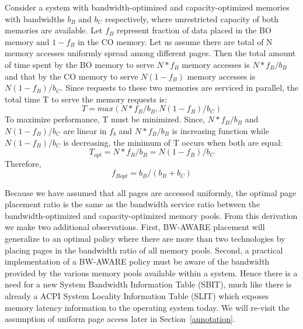 Consider a system with bandwidth-optimized and capacity-optimized
memories with bandwidths $b_B$ and $b_C$ respectively, where unrestricted
capacity of both memories are available. Let $f_B$ represent fraction of data
placed in the BO memory and $1-f_B$ in the CO memory.  Let us assume there are total of
N memory accesses uniformly spread among different pages. Then the total amount
of time spent by the BO memory to serve $N*f_B$ memory accesses is $N*f_B/b_B$ and
that by the CO memory to serve $N(1-f_B)$ memory accesses is $N(1-f_B)/b_C$.  Since
requests to these two memories are serviced in parallel, the total time T to serve the
memory requests is: 
$$T=max(N*f_B/b_B, N(1-f_B)/b_C)$$
To maximize performance, T must be minimized. Since, $N*f_B/b_B$ and
$N(1-f_B)/b_C$ are linear in $f_b$ and $N*f_B/b_B$ is increasing function while
$N(1-f_B)/b_C$ is decreasing, the minimum of T occurs when both are equal:
$$T_{opt}=N*f_B/b_B = N(1-f_B)/b_C$$
Therefore,
$$f_{Bopt}=b_B/(b_B+b_C)$$

Because we have assumed that all pages are accessed uniformly, the optimal page
placement ratio is the same as the bandwidth service ratio between the bandwidth-optimized
and capacity-optimized memory pools. From this derivation we make two additional
observations.  First, BW-AWARE placement will generalize to an optimal policy
where there are more than two technologies by placing pages in the bandwidth ratio
of all memory pools. Second, a practical implementation
of a BW-AWARE policy must be aware of the bandwidth provided by the various
memory pools available within a system. Hence there is a need for a new System
Bandwidth Information Table (SBIT), much like there is already a ACPI System
Locality 
Information Table (SLIT) which exposes memory latency information to the operating
system today. We will re-visit the assumption of uniform page access later in Section~\ref{annotation}.  

